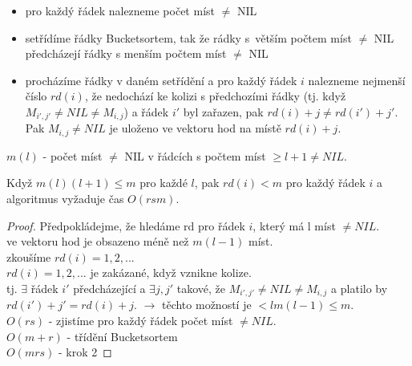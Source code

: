 \begin{itemize}
\item pro každý řádek nalezneme počet míst $\neq$ NIL
\item setřídíme řádky Bucketsortem, tak že rádky s~větším počtem míst
 $\neq$ NIL předcházejí řádky s menším počtem míst $\neq$ NIL
\item procházíme řádky v daném setřídění a pro každý řádek $i$ nalezneme
  nejmenší číslo $rd(i)$, že nedochází ke kolizi s předchozími řádky (tj.
  když $M_{i',j'} \neq NIL \neq M_{i,j}$) a řádek $i'$ byl zařazen, pak
  $rd(i) + j \neq rd(i') + j'$.
  Pak $M_{i,j} \neq NIL$ je uloženo ve vektoru hod na místě $rd(i)+j$.
\end{itemize}

$m(l)$ - počet míst $\neq$ NIL v řádcích s počtem míst $\geq l+1 \neq NIL$.

\begin{theorem}
Když $m(l)(l+1) \leq m$ pro každé $l$, pak $rd(i) < m$ pro každý řádek $i$
a algoritmus vyžaduje čas $O(rsm)$.
\end{theorem}

\begin{proof}
Předpokládejme, že hledáme rd pro řádek $i$, který má l míst $\neq NIL$. \\
ve vektoru hod je obsazeno méně než $m(l-1)$ míst. \\ 
zkoušíme $rd(i)=1,2,...$ \\
$rd(i) = 1,2,...$ je zakázané, když vznikne kolize. \\
tj. $\exists$ řádek $i'$ předcházející a $\exists j,j'$ takové, že
$M_{i',j'} \neq NIL \neq M_{i,j}$ 
a platilo by $rd(i') + j' = rd(i) + j$.
$\rightarrow$ těchto možností je $< lm(l-1) \leq m$. \\
$O(rs)$ - zjistíme pro každý řádek počet míst $\neq NIL$. \\
$O(m+r)$ - třídění Bucketsortem \\
$O(mrs)$ - krok 2
\end{proof}


